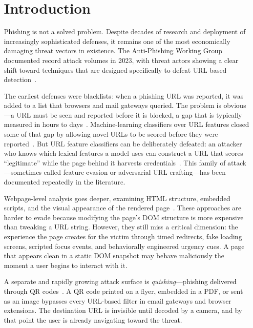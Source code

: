\documentclass[conference]{IEEEtran}
\begin{document}
\section{Introduction}

Phishing is not a solved problem.
Despite decades of research and deployment of increasingly sophisticated defenses, it remains one
of the most economically damaging threat vectors in existence.
The Anti-Phishing Working Group documented record attack volumes in 2023, with threat actors showing
a clear shift toward techniques that are designed specifically to defeat URL-based
detection~\cite{ref1,ref2}.

The earliest defenses were blacklists: when a phishing URL was reported, it was added to a list
that browsers and mail gateways queried.
The problem is obvious---a URL must be seen and reported before it is blocked, a gap that is
typically measured in hours to days~\cite{ref3}.
Machine-learning classifiers over URL features closed some of that gap by allowing novel URLs to
be scored before they were reported~\cite{ref4,ref5}.
But URL feature classifiers can be deliberately defeated: an attacker who knows which lexical
features a model uses can construct a URL that scores ``legitimate'' while the page behind it
harvests credentials~\cite{ref6}.
This family of attack---sometimes called feature evasion or adversarial URL crafting---has been
documented repeatedly in the literature.

Webpage-level analysis goes deeper, examining HTML structure, embedded scripts, and the visual
appearance of the rendered page~\cite{ref7,ref8,ref9}.
These approaches are harder to evade because modifying the page's DOM structure is more expensive
than tweaking a URL string.
However, they still miss a critical dimension: the experience the page creates for the victim
through timed redirects, fake loading screens, scripted focus events, and behaviorally engineered
urgency cues.
A page that appears clean in a static DOM snapshot may behave maliciously the moment a user
begins to interact with it.

A separate and rapidly growing attack surface is \textit{quishing}---phishing delivered through
QR codes~\cite{ref10}.
A QR code printed on a flyer, embedded in a PDF, or sent as an image bypasses every URL-based
filter in email gateways and browser extensions.
The destination URL is invisible until decoded by a camera, and by that point the user is
already navigating toward the threat.
\end{document}

